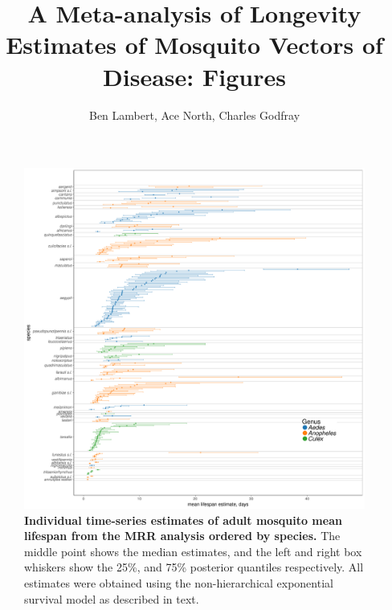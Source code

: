 \documentclass[12pt]{article}
\title{A Meta-analysis of Longevity Estimates of Mosquito Vectors of Disease: Figures}
\author{Ben Lambert, Ace North, Charles Godfray}
\begin{document}
\maketitle

\begin{figure}[h]
	\centerline{\includegraphics[width=1\textwidth]{./Figure_files/mrr_individualEstimates_allSpecies_withoutBalabacensis.pdf}}
	\caption{\textbf{Individual time-series estimates of adult mosquito mean lifespan from the MRR analysis ordered by species.} The middle point shows the median estimates, and the left and right box whiskers show the 25\%, and 75\% posterior quantiles respectively. All estimates were obtained using the non-hierarchical exponential survival model as described in text.}
	\label{fig:mrr_lifespan_individualEstimates}
\end{figure}
\end{document}
